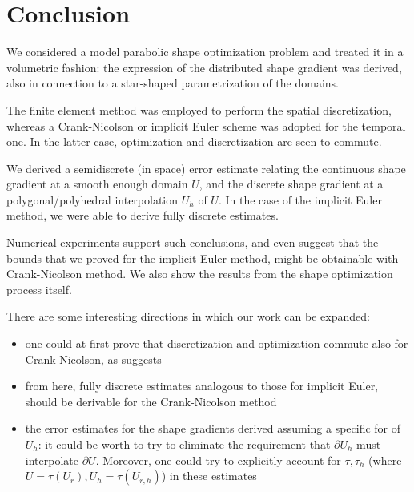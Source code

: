 \documentclass[english,a4paper,9pt,oneside]{scrbook}	%
\theoremstyle{break}
\theoremstyle{remark}
\begin{document}
\chapter{Conclusion}
\label{chap:conclusion}

We considered a model parabolic shape optimization problem and treated it in a volumetric fashion: the expression of the distributed shape gradient was derived, also in connection to a star-shaped parametrization of the domains.

The finite element method was employed to perform the spatial discretization, whereas a Crank-Nicolson or implicit Euler scheme was adopted for the temporal one. In the latter case, optimization and discretization are seen to commute.

We derived a semidiscrete (in space) error estimate relating the continuous shape gradient at a smooth enough domain $U$, and the discrete shape gradient at a polygonal/polyhedral interpolation $U_h$ of $U$. In the case of the implicit Euler method, we were able to derive fully discrete estimates.

Numerical experiments support such conclusions, and even suggest that the bounds that we proved for the implicit Euler method, might be obtainable with Crank-Nicolson method. We also show the results from the shape optimization process itself.

There are some interesting directions in which our work can be expanded:

\begin{itemize}
	\item one could at first prove that discretization and optimization commute also for Crank-Nicolson, as \cite{flaig} suggests
	\item from here, fully discrete estimates analogous to those for implicit Euler, should be derivable for the Crank-Nicolson method
	\item the error estimates for the shape gradients derived assuming a specific for of $U_h$: it could be worth to try to eliminate the requirement that $\partial U_h$ must interpolate $\partial U$. Moreover, one could try to explicitly account for $\tau, \tau_h$ (where $U=\tau (U_r), U_h = \tau(U_{r,h})$) in these estimates
\end{itemize}
\end{document}

